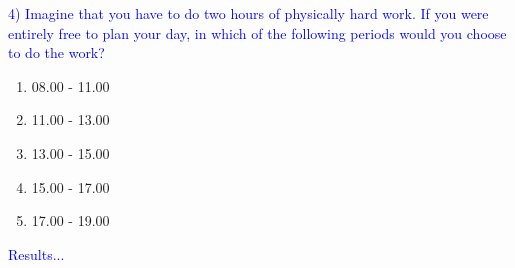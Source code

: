 \documentclass[landscape]{slides}
\begin{document}
\begin{slide}

    \textcolor{blue}{\Large{4) Imagine that you have to do two hours of physically hard work. If you were entirely free to plan your day, in which of the following periods would you choose to do the work?}}

    \begin{enumerate}
        \item 08.00 - 11.00
        \item 11.00 - 13.00
        \item 13.00 - 15.00
        \item 15.00 - 17.00
        \item 17.00 - 19.00
    \end{enumerate}

\end{slide}



\begin{slide}

    \textcolor{blue}{\Large{Results...}}

\end{slide}
\end{document}
